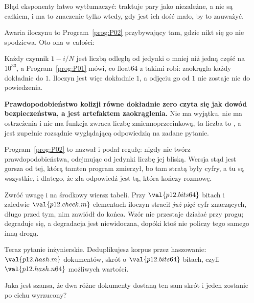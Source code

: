 \begin{fr}
Błąd eksponenty łatwo wytłumaczyć: traktuje pary jako niezależne, a nie są
całkiem, i ma to znaczenie tylko wtedy, gdy jest ich dość mało, by to
zauważyć.

Awaria iloczynu to Program~\ref{prog:P02} przybywający tam, gdzie nikt się go
nie spodziewa. Oto ona w całości:


Każdy czynnik $1 - i/N$ jest liczbą odległą od jedynki o mniej niż jedną
część na $10^{33}$, a Program~\ref{prog:P01} mówi, co float64 z takimi robi:
zaokrągla każdy dokładnie do $1$. Iloczyn jest więc dokładnie $1$, a odjęciu
go od $1$ nie zostaje nic do powiedzenia.

\begin{trapbox}
\textbf{Prawdopodobieństwo kolizji równe dokładnie zero czyta się jak dowód
bezpieczeństwa, a jest artefaktem zaokrąglenia.} Nie ma wyjątku, nie ma
ostrzeżenia i nie ma  \dash{} funkcja zwraca liczbę
zmiennoprzecinkową, ta liczba to , a  jest zupełnie
rozsądnie wyglądającą odpowiedzią na zadane pytanie.

Program~\ref{prog:P02} to nazwał i podał regułę: nigdy nie twórz
prawdopodobieństwa, odejmując od jedynki liczbę jej bliską. Wersja stąd jest
gorsza od tej, którą tamten program zmierzył, bo tam stratą były cyfry, a tu
są wszystkie, i dlatego, że zła odpowiedź jest tą, która kończy rozmowę.

Zwróć uwagę i na środkowy wiersz tabeli. Przy $\val{p12.bits64}$ bitach i
zaledwie $\val{p12.check.m}$ elementach iloczyn stracił \emph{już} pięć cyfr
znaczących, długo przed tym, nim zawiódł do końca. Wzór nie przestaje działać
przy progu; degraduje się, a degradacja jest niewidoczna, dopóki ktoś nie
policzy tego samego inną drogą.
\end{trapbox}
\end{fr}

\begin{fr}
Teraz pytanie inżynierskie. Deduplikujesz korpus przez haszowanie:
$\val{p12.hash.m}$ dokumentów, skrót o $\val{p12.bits64}$ bitach, czyli
$\val{p12.hash.n64}$ możliwych wartości.

Jaka jest szansa, że dwa różne dokumenty dostaną ten sam skrót i jeden
zostanie po cichu wyrzucony?
\dotline
\nextframe
\end{fr}

